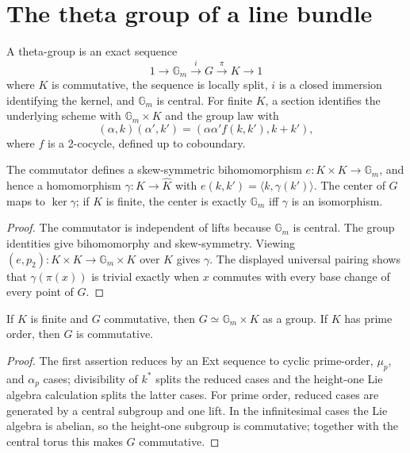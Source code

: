 \section{The theta group of a line bundle}
\label{mumford-IV23-source}

\begin{definition}
\label{mumford-def-theta-group}
A theta-group is an exact sequence
\[
1\to\mathbb G_m\xrightarrow{i}G\xrightarrow{\pi}K\to1
\]
where $K$ is commutative, the sequence is locally split, $i$ is a closed
immersion identifying the kernel, and $\mathbb G_m$ is central. For finite
$K$, a section identifies the underlying scheme with
$\mathbb G_m\times K$ and the group law with
\[
(\alpha,k)(\alpha',k')=(\alpha\alpha'f(k,k'),k+k'),
\]
where $f$ is a 2-cocycle, defined up to coboundary.
\end{definition}

\begin{proposition}
\label{mumford-prop-theta-commutator}
The commutator defines a skew-symmetric bihomomorphism
$e:K\times K\to\mathbb G_m$, and hence a homomorphism
$\gamma:K\to\widehat K$ with
$e(k,k')=\langle k,\gamma(k')\rangle$. The center of $G$ maps to
$\ker\gamma$; if $K$ is finite, the center is exactly $\mathbb G_m$ iff
$\gamma$ is an isomorphism.
\end{proposition}
\begin{proof}
The commutator is independent of lifts because $\mathbb G_m$ is central.
The group identities give bihomomorphy and skew-symmetry. Viewing
$(e,p_2):K\times K\to\mathbb G_m\times K$ over $K$ gives $\gamma$.
The displayed universal pairing shows that $\gamma(\pi(x))$ is trivial
exactly when $x$ commutes with every base change of every point of $G$.
\end{proof}

\begin{lemma}
\label{mumford-lem-theta-extension-prime-order}
If $K$ is finite and $G$ commutative, then
$G\simeq\mathbb G_m\times K$ as a group. If $K$ has prime order, then $G$
is commutative.
\end{lemma}
\begin{proof}
The first assertion reduces by an Ext sequence to cyclic prime-order,
$\mu_p$, and $\alpha_p$ cases; divisibility of $k^*$ splits the reduced
cases and the height-one Lie algebra calculation splits the latter cases.
For prime order, reduced cases are generated by a central subgroup and one
lift. In the infinitesimal cases the Lie algebra is abelian, so the
height-one subgroup is commutative; together with the central torus this
makes $G$ commutative.
\end{proof}

